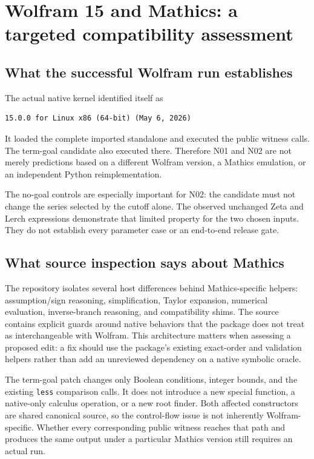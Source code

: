 \documentclass[11pt,letterpaper]{article}
\newcommand{\code}[1]{\nolinkurl{#1}}
\begin{document}
\section{Wolfram 15 and Mathics: a targeted compatibility assessment}
\subsection{What the successful Wolfram run establishes}
The actual native kernel identified itself as
\begin{lstlisting}
15.0.0 for Linux x86 (64-bit) (May 6, 2026)
\end{lstlisting}
It loaded the complete imported standalone and executed the public witness
calls. The term-goal candidate also executed there. Therefore N01 and N02 are
not merely predictions based on a different Wolfram version, a Mathics
emulation, or an independent Python reimplementation.

The no-goal controls are especially important for N02: the candidate must not
change the series selected by the cutoff alone. The observed unchanged
Zeta and Lerch expressions demonstrate that limited property for the two
chosen inputs. They do not establish every parameter case or an end-to-end
release gate.

\subsection{What source inspection says about Mathics}
The repository isolates several host differences behind Mathics-specific
helpers: assumption/sign reasoning, simplification, Taylor expansion,
numerical evaluation, inverse-branch reasoning, and compatibility shims.
The source contains explicit guards around native behaviors that the package
does not treat as interchangeable with Wolfram. This architecture matters when
assessing a proposed edit: a fix should use the package's existing exact-order
and validation helpers rather than add an unreviewed dependency on a native
symbolic oracle.~\cite{mathics-assumptions,mathics-simplification,mathics-compat}

The term-goal patch changes only Boolean conditions, integer bounds, and the
existing \code{less} comparison calls. It does not introduce a new special
function, a native-only calculus operation, or a new root finder. Both affected
constructors are shared canonical source, so the control-flow issue is not
inherently Wolfram-specific. Whether every corresponding public witness reaches
that path and produces the same output under a particular Mathics version
still requires an actual run.
\end{document}
